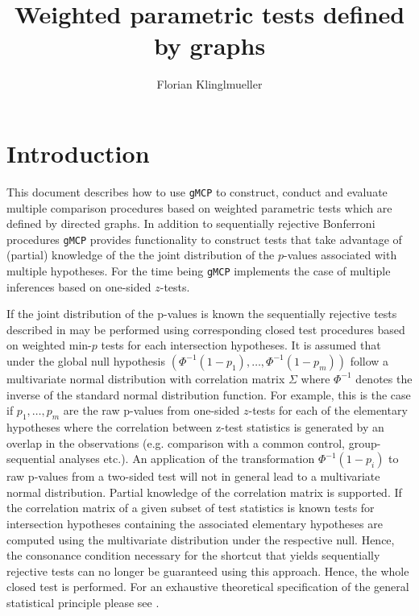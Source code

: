 \documentclass[a4paper, 11pt]{article}\usepackage[]{graphicx}\usepackage[]{color}
\newcommand{\gmcp}{\texttt{gMCP}\xspace}
\begin{document}

\title{Weighted parametric tests defined by graphs} 

\author{Florian Klinglmueller}

\maketitle

\tableofcontents


\section{Introduction}
\label{sec:intro}

This document describes how to use \gmcp to construct, conduct and evaluate
multiple comparison procedures based on  weighted parametric tests
which are defined by directed graphs. In addition to sequentially
rejective Bonferroni procedures \gmcp provides functionality to
construct tests that take advantage of (partial) knowledge of the
the joint distribution of the $p$-values associated with multiple
hypotheses. For the time being \gmcp implements the case of multiple
inferences based on one-sided $z$-tests. 

If the joint distribution of the p-values is known the sequentially
rejective tests described in \cite{bretzEtAl2009graphical} may be
performed using corresponding closed test procedures based on weighted
min-$p$ tests for each intersection hypotheses.  It is assumed that
under the global null hypothesis
$(\Phi^{-1}(1-p_1),\ldots,\Phi^{-1}(1-p_m))$ follow a multivariate
normal distribution with correlation matrix $\Sigma$ where
$\Phi^{-1}$ denotes the inverse of the standard normal
distribution function. For example, this is the case if $p_1,\ldots,
  p_m$ are the raw p-values from one-sided $z$-tests for each of the
elementary hypotheses where the correlation between z-test statistics
is generated by an overlap in the observations (e.g. comparison with a
common control, group-sequential analyses etc.). An application of the
transformation $\Phi^{-1}(1-p_i)$ to raw p-values from a two-sided
test will not in general lead to a multivariate normal
distribution. Partial knowledge of the correlation matrix is
supported.  If the correlation matrix of a given subset of test
statistics is known tests for intersection hypotheses containing the
associated elementary hypotheses are computed using the multivariate
distribution under the respective null. Hence, the consonance condition
necessary for the shortcut that yields sequentially rejective tests
can no longer be guaranteed using this approach. Hence, the whole
closed test is performed. For an exhaustive theoretical specification
of the general statistical principle please see \cite[Section
3.2]{Bretz11}.
\end{document}
